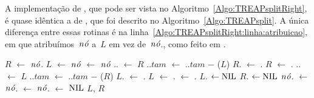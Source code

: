 A implementação de \treapSplitRight{}, que pode ser vista no Algoritmo~\ref{Algo:TREAPsplitRight}, é quase idêntica a de \treapSplit{}, que foi descrito no Algoritmo~\ref{Algo:TREAPsplit}.
A única diferença entre essas rotinas é na linha~\ref{Algo:TREAPsplitRight:linha:atribuicao}, em que atribuímos~$\node$ a~$L$ em vez de~$\node$., como feito em \treapSplit{}.

\begin{algorithm}
\caption{\treapSplitRight($\node$)}
\label{Algo:TREAPsplitRight}
\begin{algorithmic}[1]
\State $R$ $\gets $ $\node$.
\State $L$ $\gets $ $\node$ \label{Algo:TREAPsplitRight:linha:atribuicao}
\State {} $\gets$ $\node$
    \State {}.. $\gets$ $R$
    \State {}..$tam$ $\gets$ ..$tam$ $\mathit{-}$ \treapGetSize($L$)
    \State $R$. $\gets$ .
    \EndIf
    \State $R$ $\gets$ .
  \Else
    \State {}.. $\gets$ $L$ 
    \State {}..$tam$ $\gets$ ..$tam$ $\mathit{-}$ \treapGetSize($R$)
    \State $L$. $\gets$ .
    \EndIf
    \State $L$ $\gets$ .
  \EndIf
  \State {} $\gets$ .
\EndWhile
{} $L$. $\gets\text{NIL}$\EndIf
{} $R$. $\gets\text{NIL}$\EndIf
\State $\node$. $\gets $ $\node$. $\gets$ $\node$. $\gets$ $\text{NIL}$
\State\Return $L$, $R$
\end{algorithmic}
\end{algorithm}

